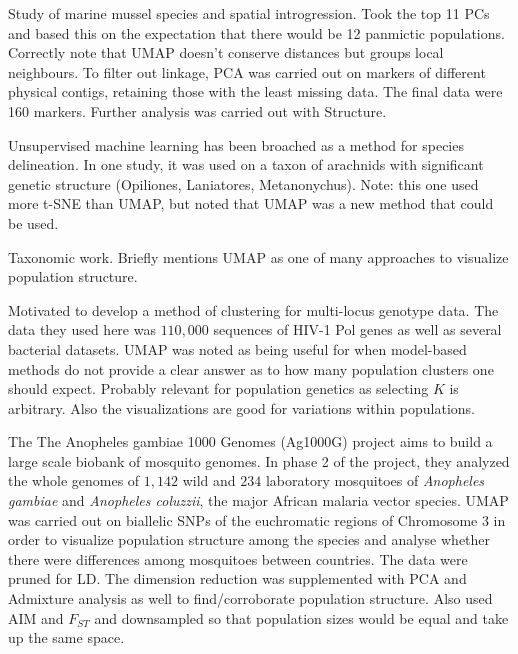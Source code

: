\documentclass[12pt]{article}
\begin{document}
Study of marine mussel species and spatial introgression. Took the top 11 PCs and based this on the expectation that there would be 12 panmictic populations. Correctly note that UMAP doesn't conserve distances but groups local neighbours. To filter out linkage, PCA was carried out on markers of different physical contigs, retaining those with the least missing data. The final data were 160 markers. Further analysis was carried out with Structure. \cite{simon_local_2019}

Unsupervised machine learning has been broached as a method for species delineation. In one study, it was used on a taxon of arachnids with significant genetic structure (Opiliones, Laniatores, Metanonychus). Note: this one used more t-SNE than UMAP, but noted that UMAP was a new method that could be used.\cite{derkarabetian_demonstration_2019}

Taxonomic work. Briefly mentions UMAP as one of many approaches to visualize population structure. \cite{greenbaum_network-based_2019}

Motivated to develop a method of clustering for multi-locus genotype data. The data they used here was $110,000$ sequences of HIV-1 Pol genes as well as several bacterial datasets. UMAP was noted as being useful for when model-based methods do not provide a clear answer as to how many population clusters one should expect. Probably relevant for population genetics as selecting $K$ is arbitrary. Also the visualizations are good for variations within populations.\cite{tonkin-hill_fast_2019}


The The Anopheles gambiae 1000 Genomes (Ag1000G) project aims to build a large scale biobank of mosquito genomes. In phase 2 of the project, they analyzed the whole genomes of $1,142$ wild and $234$ laboratory mosquitoes of \textit{Anopheles gambiae} and \textit{Anopheles coluzzii}, the major African malaria vector species. UMAP was carried out on biallelic SNPs of the euchromatic regions of Chromosome 3 in order to visualize population structure among the species and analyse whether there were differences among mosquitoes between countries. The data were pruned for LD. The dimension reduction was supplemented with PCA and Admixture analysis as well to find/corroborate population structure. Also used AIM and $F_{ST}$ and downsampled so that population sizes would be equal and take up the same space.\cite{consortium_genome_2020}
\end{document}
